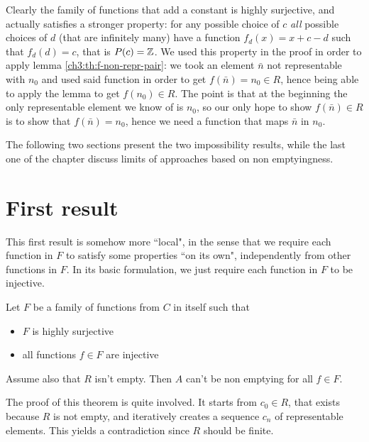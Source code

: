 Clearly the family of functions that add a constant is highly surjective, and actually satisfies a stronger property: for any possible choice of $c$ \textit{all} possible choices of $d$ (that are infinitely many) have a function $f_d(x) = x + c - d$ such that $f_d(d) = c$, that is $P(c) = \mathbb{Z}$. We used this property in the proof in order to apply lemma \ref{ch3:th:f-non-repr-pair}: we took an element $\bar{n}$ not representable with $n_0$ and used said function in order to get $f(\bar{n}) = n_0 \in R$, hence being able to apply the lemma to get $f(n_0) \in R$. The point is that at the beginning the only representable element we know of is $n_0$, so our only hope to show $f(\bar{n}) \in R$ is to show that $f(\bar{n}) = n_0$, hence we need a function that maps $\bar{n}$ in $n_0$.

The following two sections present the two impossibility results, while the last one of the chapter discuss limits of approaches based on non emptyingness.

\section{First result}
This first result is somehow more ``local", in the sense that we require each function in $F$ to satisfy some properties ``on its own", independently from other functions in $F$. In its basic formulation, we just require each function in $F$ to be injective.

\begin{theorem}\label{ch4:th:non-empt-res-local-basic}
	Let $F$ be a family of functions from $C$ in itself such that
	\begin{itemize}
		\item $F$ is highly surjective
		\item all functions $f \in F$ are injective
	\end{itemize}
	Assume also that $R$ isn't empty. Then $A$ can't be non emptying for all $f \in F$.
\end{theorem}
The proof of this theorem is quite involved. It starts from $c_0 \in R$, that exists because $R$ is not empty, and iteratively creates a sequence $c_n$ of representable elements. This yields a contradiction since $R$ should be finite.

